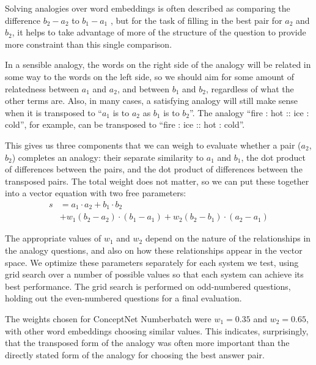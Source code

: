 \documentclass[letterpaper]{article}
\begin{document}
Solving analogies over word embeddings is often described as comparing the
difference $b_2 - a_2$ to $b_1 - a_1$ \cite{mikolov2013word2vec}, but for the
task of filling in the best pair for $a_2$ and $b_2$, it helps to take
advantage of more of the structure of the question to provide more constraint
than this single comparison.

In a sensible analogy, the words on the right side of the analogy will be
related in some way to the words on the left side, so we should aim for some
amount of relatedness between $a_1$ and $a_2$, and between $b_1$ and $b_2$,
regardless of what the other terms are. Also, in many cases, a satisfying
analogy will still make sense when it is transposed to ``$a_1$ is to $a_2$ as
$b_1$ is to $b_2$''. The analogy ``fire : hot :: ice : cold'', for example, can
be transposed to ``fire : ice :: hot : cold''.

This gives us three components that we can weigh to evaluate whether a pair
($a_2$, $b_2$) completes an analogy: their separate similarity to $a_1$ and
$b_1$, the dot product of differences between the pairs, and the dot product of
differences between the transposed pairs.  The total weight does not matter, so
we can put these together into a vector equation with two free parameters:
\begin{equation*}
    \begin{split}
        s &= a_1 \cdot a_2 + b_1 \cdot b_2\\
          &  + w_1(b_2 - a_2) \cdot (b_1 - a_1)
             + w_2(b_2 - b_1) \cdot (a_2 - a_1)
    \end{split}
\end{equation*}

The appropriate values of $w_1$ and $w_2$ depend on the nature of the
relationships in the analogy questions, and also on how these relationships
appear in the vector space. We optimize these parameters separately for each
system we test, using grid search over a number of possible values so that each
system can achieve its best performance. The grid search is performed on
odd-numbered questions, holding out the even-numbered questions for a final
evaluation.

The weights chosen for ConceptNet Numberbatch were $w_1 = 0.35$ and $w_2 =
0.65$, with other word embeddings choosing similar values. This indicates,
surprisingly, that the transposed form of the analogy was often more important
than the directly stated form of the analogy for choosing the best answer pair.
\end{document}
